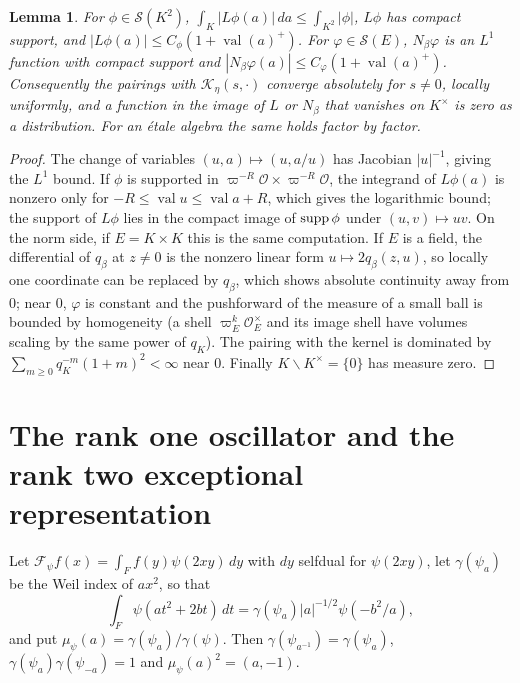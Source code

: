 \documentclass[11pt,oneside,notitlepage]{book}
\numberwithin{equation}{section}
\theoremstyle{plain}
\newtheorem{lemma}[theorem]{Lemma}
\theoremstyle{definition}
\newcommand{\cO}{\mathcal{O}}
\newcommand{\cS}{\mathcal{S}}
\newcommand{\val}{\operatorname{val}}
\newcommand{\hil}[2]{(#1,#2)}
\begin{document}
\begin{lemma}\label{lem:L1}
For $\phi\in\cS(K^2)$, $\int_K|L\phi(a)|\,da\le\int_{K^2}|\phi|$, $L\phi$ has compact support, and $|L\phi(a)|\le C_\phi(1+\val(a)^+)$. For $\varphi\in\cS(E)$, $N_\beta\varphi$ is an $L^1$ function with compact support and $|N_\beta\varphi(a)|\le C_\varphi(1+\val(a)^+)$. Consequently the pairings with $\mathcal K_\eta(s,\cdot)$ converge absolutely for $s\ne0$, locally uniformly, and a function in the image of $L$ or $N_\beta$ that vanishes on $K^\times$ is zero as a distribution. For an \'etale algebra the same holds factor by factor.
\end{lemma}
\begin{proof}
The change of variables $(u,a)\mapsto(u,a/u)$ has Jacobian $|u|^{-1}$, giving the $L^1$ bound. If $\phi$ is supported in $\varpi^{-R}\cO\times\varpi^{-R}\cO$, the integrand of $L\phi(a)$ is nonzero only for $-R\le\val u\le\val a+R$, which gives the logarithmic bound; the support of $L\phi$ lies in the compact image of ${\rm supp}\,\phi$ under $(u,v)\mapsto uv$. On the norm side, if $E=K\times K$ this is the same computation. If $E$ is a field, the differential of $q_\beta$ at $z\ne0$ is the nonzero linear form $u\mapsto2q_\beta(z,u)$, so locally one coordinate can be replaced by $q_\beta$, which shows absolute continuity away from $0$; near $0$, $\varphi$ is constant and the pushforward of the measure of a small ball is bounded by homogeneity (a shell $\varpi_E^k\cO_E^\times$ and its image shell have volumes scaling by the same power of $q_K$). The pairing with the kernel is dominated by $\sum_{m\ge0}q_K^{-m}(1+m)^2<\infty$ near $0$. Finally $K\smallsetminus K^\times=\{0\}$ has measure zero.
\end{proof}

\section{The rank one oscillator and the rank two exceptional representation}\label{sec:oscillator}

Let $\mathcal F_\psi f(x)=\int_Ff(y)\psi(2xy)\,dy$ with $dy$ selfdual for $\psi(2xy)$, let $\gamma(\psi_a)$ be the Weil index of $ax^2$, so that
\begin{equation}\label{eq:gauss1}
\int_F\psi(at^2+2bt)\,dt=\gamma(\psi_a)|a|^{-1/2}\psi(-b^2/a),
\end{equation}
and put $\mu_\psi(a)=\gamma(\psi_a)/\gamma(\psi)$. Then $\gamma(\psi_{a^{-1}})=\gamma(\psi_a)$, $\gamma(\psi_a)\gamma(\psi_{-a})=1$ and $\mu_\psi(a)^2=\hil a{-1}$.
\end{document}
